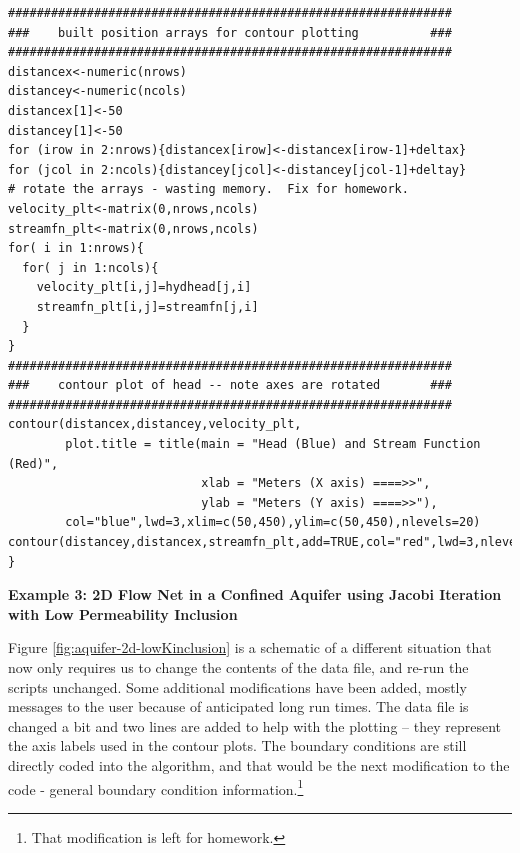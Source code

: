 \begin{lstlisting}[caption= R code demonstrating an Velocity Potential -- Stream Function Simulator for 2D Steady Flow.  This code fragment implements the contour plotting \\ , label=lst:2by2contour]
##############################################################
###    built position arrays for contour plotting          ###
##############################################################
distancex<-numeric(nrows)
distancey<-numeric(ncols)
distancex[1]<-50
distancey[1]<-50
for (irow in 2:nrows){distancex[irow]<-distancex[irow-1]+deltax}
for (jcol in 2:ncols){distancey[jcol]<-distancey[jcol-1]+deltay}
# rotate the arrays - wasting memory.  Fix for homework.
velocity_plt<-matrix(0,nrows,ncols) 
streamfn_plt<-matrix(0,nrows,ncols) 
for( i in 1:nrows){
  for( j in 1:ncols){
    velocity_plt[i,j]=hydhead[j,i]
    streamfn_plt[i,j]=streamfn[j,i]
  }
}
##############################################################
###    contour plot of head -- note axes are rotated       ###
##############################################################
contour(distancex,distancey,velocity_plt,
        plot.title = title(main = "Head (Blue) and Stream Function (Red)",
                           xlab = "Meters (X axis) ====>>", 
                           ylab = "Meters (Y axis) ====>>"),
        col="blue",lwd=3,xlim=c(50,450),ylim=c(50,450),nlevels=20)
contour(distancey,distancex,streamfn_plt,add=TRUE,col="red",lwd=3,nlevels=20)
}\end{lstlisting}

\clearpage
\textbf{Example 3: 2D Flow Net in a Confined Aquifer using Jacobi Iteration with Low Permeability Inclusion}

Figure \ref{fig:aquifer-2d-lowKinclusion} is a schematic of a different situation that now only requires us to change the contents of the data file, and re-run the scripts unchanged.  
Some additional modifications have been added, mostly messages to the user because of anticipated long run times.    
The data file is changed a bit and two lines are added to help with the plotting -- they represent the axis labels used in the contour plots.
The boundary conditions are still directly coded into the algorithm, and that would be the next modification to the code - general boundary condition information.\footnote{That modification is left for homework.}

